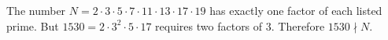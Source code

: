 The number $N=2\cdot3\cdot5\cdot7\cdot11\cdot13\cdot17\cdot19$ has exactly one factor of each listed prime. But $1530=2\cdot3^2\cdot5\cdot17$ requires two factors of $3$. Therefore $\boxed{1530\nmid N}$.
